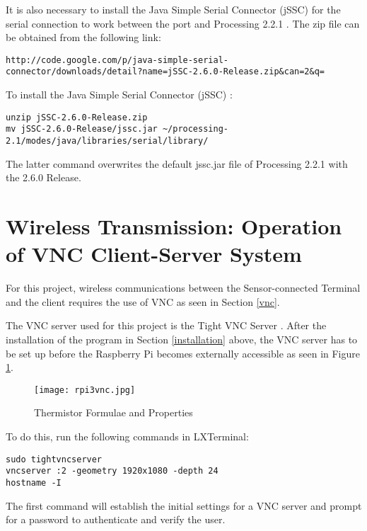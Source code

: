 It is also necessary to install the Java Simple Serial Connector (jSSC) for the serial connection to work between the port and Processing 2.2.1 \cite{installingprocessing}. The zip file can be obtained from the following link: 

\begin{lstlisting}
http://code.google.com/p/java-simple-serial-connector/downloads/detail?name=jSSC-2.6.0-Release.zip&can=2&q=
\end{lstlisting}

To install the Java Simple Serial Connector (jSSC) \cite{installingprocessing}: 
\begin{lstlisting}
unzip jSSC-2.6.0-Release.zip
mv jSSC-2.6.0-Release/jssc.jar ~/processing-2.1/modes/java/libraries/serial/library/
\end{lstlisting} 

The latter command overwrites the default jssc.jar file of Processing 2.2.1 with the 2.6.0 Release. 

\section{Wireless Transmission: Operation of VNC Client-Server System}

For this project, wireless communications between the Sensor-connected Terminal and the client requires the use of VNC as seen in Section \ref{vnc}. 

The VNC server used for this project is the Tight VNC Server \cite{rpitightvncserver}. After the installation of the program in Section \ref{installation} above, the VNC server has to be set up before the Raspberry Pi becomes externally accessible as seen in Figure \ref{rpi3vnc}. 

\begin{figure}[H]
	\centering
	\texttt{[image: rpi3vnc.jpg]}
	\caption{Thermistor Formulae and Properties \cite{rpitightvncserver}}
	\label{rpi3vnc}
\end{figure}

To do this, run the following commands in LXTerminal: 

\begin{lstlisting}
sudo tightvncserver
vncserver :2 -geometry 1920x1080 -depth 24 
hostname -I
\end{lstlisting}

The first command will establish the initial settings for a VNC server and prompt for a password to authenticate and verify the user. 

